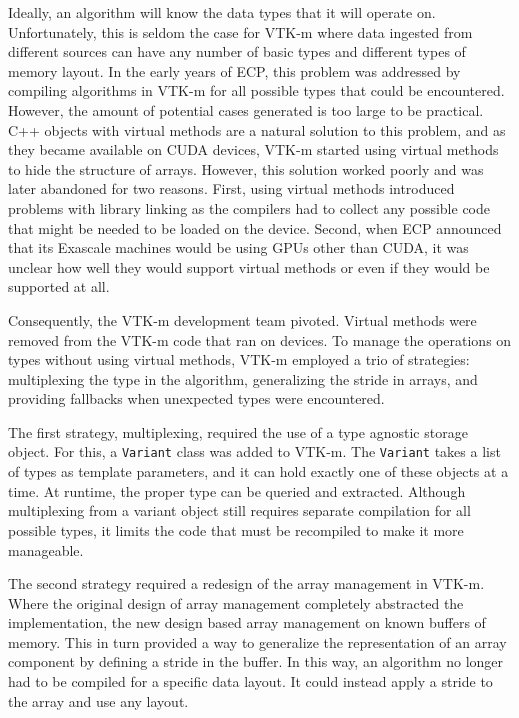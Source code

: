 
Ideally, an algorithm
will know the data types that it will operate on.
Unfortunately, this is seldom the case for VTK-m where data ingested from different sources can have any number of basic types
and different types of memory layout.
In the early years of ECP, this problem was addressed by compiling algorithms in VTK-m for all possible types that could be encountered.
However, the amount of potential cases generated is too large to be practical.
C++ objects with virtual methods are a natural solution to this problem, and as they became available on CUDA devices, VTK-m started using virtual methods to hide the structure of arrays.
However, this solution worked poorly and was later abandoned for two reasons.
First, using virtual methods introduced problems with library linking as the compilers had to collect any possible code that might be needed to be loaded on the device.
Second, when ECP announced that its Exascale machines would be using GPUs other than CUDA, it was unclear how well they would support virtual methods or even if they would be supported at all.

Consequently, the VTK-m development team pivoted.
Virtual methods were removed from the VTK-m code that ran on devices.
To manage the operations on types without using virtual methods, VTK-m employed a trio of strategies: multiplexing the type in the algorithm, generalizing the stride in arrays, and providing fallbacks when unexpected types were encountered.

The first strategy, multiplexing, required the use of a type agnostic storage object.
For this, a \texttt{Variant} class was added to VTK-m.
The \texttt{Variant} takes a list of types as template parameters, and it can hold exactly one of these objects at a time.
At runtime, the proper type can be queried and extracted.
Although multiplexing from a variant object still requires separate compilation for all possible types, it limits the code that must be recompiled to make it more manageable.

The second strategy required a redesign of the array management in VTK-m.
Where the original design of array management completely abstracted the implementation, the new design based array management on known buffers of memory.
This in turn provided a way to generalize the representation of an array component by defining a stride in the buffer.
In this way, an algorithm no longer had to be compiled for a specific data layout.
It could instead apply a stride to the array and use any layout.

